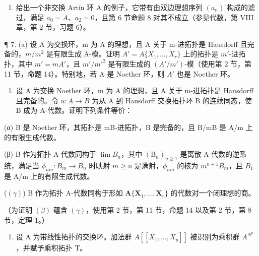 \begin{enumerate}
\def\labelenumi{\arabic{enumi}.}
\setcounter{enumi}{5}
\tightlist
\item
  给出一个非交换 Artin 环 A 的例子，它带有由双边理想序列 \((a_{n})\) 构成的滤过，满足 \(a_{0} = A\)、\(a_{2} = 0\)，且第 6 节命题 8 对其不成立（参见代数，第 VIII 章，第 2 节，习题 6）。~
\end{enumerate}

¶ 7. (a) 设 A 为交换环，m 为 A 的理想，且 A 关于 m-进拓扑是 Hausdorff 且完备的，\(m/m^{2}\) 是有限生成 A-模。证明 \(A' = A\{X_{1}, \ldots, X_{r}\}\) 上的拓扑是 \(m'\)-进拓扑，其中 \(m' = mA'\)，且 \(m'/m'^{2}\) 是有限生成的 \((A'/m')\)-模（使用第 2 节，第 11 节，命题 14）。特别地，若 A 是 Noether 环，则 \(A'\) 也是 Noether 环。

\begin{enumerate}
\def\labelenumi{(\alph{enumi})}
\setcounter{enumi}{1}
\tightlist
\item
  设 A 为交换 Noether 环，m 为 A 的理想，且 A 关于 m-进拓扑是 Hausdorff 且完备的。令 \(u: A \rightarrow B\) 为从 A 到 Hausdorff 交换拓扑环 B 的连续同态，使 B 成为 A-代数。证明下列条件等价：
\end{enumerate}

(α) B 是 Noether 环，其拓扑是 mB-进拓扑，B 是完备的，且 B/mB 是 A/m 上的有限生成代数。

(β) B 作为拓扑 A-代数同构于 \(\lim B_{n}\)，其中 \((\mathrm{B}_{n})_{n\geqslant1}\) 是离散 A-代数的逆系统，满足当 \(\phi_{nm}:B_{m}\to B_{n}\) 时映射 \(m\geqslant n\) 是满射，\(\phi_{nm}\) 的核为 \(m^{n+1}B_{m}\)，且 \(B_{1}\) 是 A/m 上的有限生成代数。

(\((\gamma)\)) B 作为拓扑 A-代数同构于形如 \(\mathbf{A}\{\mathbf{X}_1,\dots ,\mathbf{X}_r\}\) 的代数对一个闭理想的商。

（为证明 \((\beta)\) 蕴含 \((\gamma)\)，使用第 2 节，第 11 节，命题 14 以及第 2 节，第 8 节，定理 1。）

\begin{enumerate}
\def\labelenumi{\arabic{enumi}.}
\setcounter{enumi}{7}
\tightlist
\item
  设 A 为带线性拓扑的交换环。加法群 \(A[[X_{1},\ldots,X_{p}]]\) 被识别为乘积群 \(A^{N^{p}}\)，并赋予乘积拓扑 T。
\end{enumerate}

